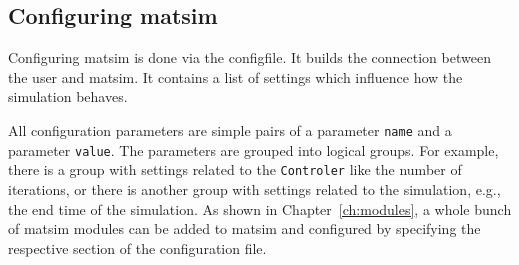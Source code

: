 \subsection{Configuring \protect\gls{matsim}}
\label{sec:config}
Configuring \gls{matsim} is 
done via the \gls{configfile}. It builds the connection between the user and \gls{matsim}. It contains a list of settings which influence how the simulation behaves.
%
%

All configuration parameters are simple pairs of a \gls{parameter} \lstinline|name| and a \gls{parameter} \lstinline|value|. The \glspl{parameter} are grouped into logical groups. For example, there is a group with settings related to the \lstinline|Controler| like the number of \glspl{iteration}, or there is another group with settings related to the \gls{simulation}, e.g.,\,the end time of the simulation. As shown in Chapter~\ref{ch:modules}, a whole bunch of \gls{matsim} modules can be added to \gls{matsim} and configured by specifying the respective section of the configuration file.

